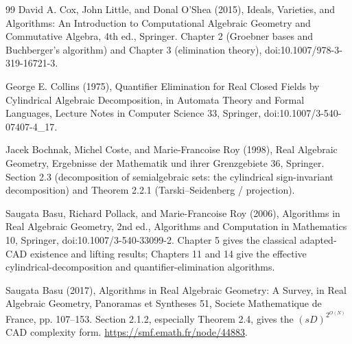 \documentclass{article}
\begin{document}
\begin{thebibliography}{99}
   David A. Cox, John Little, and Donal O'Shea (2015), Ideals, Varieties, and Algorithms: An Introduction to Computational Algebraic Geometry and Commutative Algebra, 4th ed., Springer. Chapter 2 (Groebner bases and Buchberger's algorithm) and Chapter 3 (elimination theory), doi:10.1007/978-3-319-16721-3.

   George E. Collins (1975), Quantifier Elimination for Real Closed Fields by Cylindrical Algebraic Decomposition, in Automata Theory and Formal Languages, Lecture Notes in Computer Science 33, Springer, doi:10.1007/3-540-07407-4_17.

   Jacek Bochnak, Michel Coste, and Marie-Francoise Roy (1998), Real Algebraic Geometry, Ergebnisse der Mathematik und ihrer Grenzgebiete 36, Springer. Section 2.3 (decomposition of semialgebraic sets: the cylindrical sign-invariant decomposition) and Theorem 2.2.1 (Tarski--Seidenberg / projection).

   Saugata Basu, Richard Pollack, and Marie-Francoise Roy (2006), Algorithms in Real Algebraic Geometry, 2nd ed., Algorithms and Computation in Mathematics 10, Springer, doi:10.1007/3-540-33099-2. Chapter 5 gives the classical adapted-CAD existence and lifting results; Chapters 11 and 14 give the effective cylindrical-decomposition and quantifier-elimination algorithms.

   Saugata Basu (2017), Algorithms in Real Algebraic Geometry: A Survey, in Real Algebraic Geometry, Panoramas et Syntheses 51, Societe Mathematique de France, pp. 107--153. Section 2.1.2, especially Theorem 2.4, gives the $(sD)^{2^{O(N)}}$ CAD complexity form. \url{https://smf.emath.fr/node/44883}.

\end{thebibliography}
\end{document}
